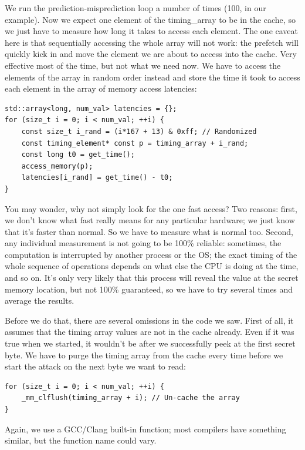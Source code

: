 We run the prediction-misprediction loop a number of times (100, in our example). Now we expect one element of the timing\_array to be in the cache, so we just have to measure how long it takes to access each element. The one caveat here is that sequentially accessing the whole array will not work: the prefetch will quickly kick in and move the element we are about to access into the cache. Very effective most of the time, but not what we need now. We have to access the elements of the array in random order instead and store the time it took to access each element in the array of memory access latencies:

\begin{lstlisting}[style=styleCXX]
std::array<long, num_val> latencies = {};
for (size_t i = 0; i < num_val; ++i) {
	const size_t i_rand = (i*167 + 13) & 0xff; // Randomized
	const timing_element* const p = timing_array + i_rand;
	const long t0 = get_time();
	access_memory(p);
	latencies[i_rand] = get_time() - t0;
}
\end{lstlisting}

You may wonder, why not simply look for the one fast access? Two reasons: first, we don't know what fast really means for any particular hardware; we just know that it's faster than normal. So we have to measure what is normal too. Second, any individual measurement is not going to be 100\% reliable: sometimes, the computation is interrupted by another process or the OS; the exact timing of the whole sequence of operations depends on what else the CPU is doing at the time, and so on. It's only very likely that this process will reveal the value at the secret memory location, but not 100\% guaranteed, so we have to try several times and average the results.

Before we do that, there are several omissions in the code we saw. First of all, it assumes that the timing array values are not in the cache already. Even if it was true when we started, it wouldn't be after we successfully peek at the first secret byte. We have to purge the timing array from the cache every time before we start the attack on the next byte we want to read:

\begin{lstlisting}[style=styleCXX]
for (size_t i = 0; i < num_val; ++i) {
	_mm_clflush(timing_array + i); // Un-cache the array
}
\end{lstlisting}

Again, we use a GCC/Clang built-in function; most compilers have something similar, but the function name could vary.

